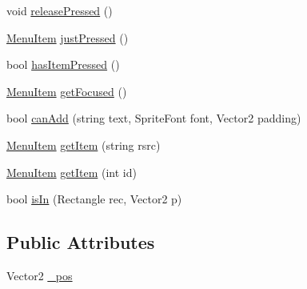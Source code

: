 \begin{DoxyCompactItemize}
\item 
void \hyperlink{classgearit_1_1src_1_1utility_1_1_menu_1_1_menu_overlay_a132ef6fbebb2601cf1f1d99f57533629}{release\+Pressed} ()
\item 
\hyperlink{classgearit_1_1src_1_1utility_1_1_menu_1_1_menu_item}{Menu\+Item} \hyperlink{classgearit_1_1src_1_1utility_1_1_menu_1_1_menu_overlay_ad0608dc437d3018e060764a5615da08e}{just\+Pressed} ()
\item 
bool \hyperlink{classgearit_1_1src_1_1utility_1_1_menu_1_1_menu_overlay_a2e82da357a15df7adc0140977e6f3e6e}{has\+Item\+Pressed} ()
\item 
\hyperlink{classgearit_1_1src_1_1utility_1_1_menu_1_1_menu_item}{Menu\+Item} \hyperlink{classgearit_1_1src_1_1utility_1_1_menu_1_1_menu_overlay_a854634a781501cc3714f57cb41efcc99}{get\+Focused} ()
\item 
bool \hyperlink{classgearit_1_1src_1_1utility_1_1_menu_1_1_menu_overlay_af37d107ade4756b729b69380ab18ce05}{can\+Add} (string text, Sprite\+Font font, Vector2 padding)
\item 
\hyperlink{classgearit_1_1src_1_1utility_1_1_menu_1_1_menu_item}{Menu\+Item} \hyperlink{classgearit_1_1src_1_1utility_1_1_menu_1_1_menu_overlay_a7cfd2b5b0c02cfef0be45817ced2c5e9}{get\+Item} (string rsrc)
\item 
\hyperlink{classgearit_1_1src_1_1utility_1_1_menu_1_1_menu_item}{Menu\+Item} \hyperlink{classgearit_1_1src_1_1utility_1_1_menu_1_1_menu_overlay_a830ebd2bff69252a60b7ad01b3a0fbed}{get\+Item} (int id)
\item 
bool \hyperlink{classgearit_1_1src_1_1utility_1_1_menu_1_1_menu_overlay_a61587597d701aa89d62c1e2d52d4a04b}{is\+In} (Rectangle rec, Vector2 p)
\end{DoxyCompactItemize}
\subsection*{Public Attributes}
\begin{DoxyCompactItemize}
\item 
Vector2 \hyperlink{classgearit_1_1src_1_1utility_1_1_menu_1_1_menu_overlay_a6eb6e8a1de0c6b2c0369ee0f0a24354b}{\+\_\+pos}
\end{DoxyCompactItemize}
